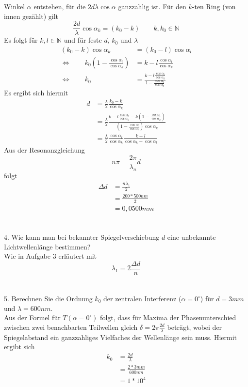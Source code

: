 \documentclass{article}
\begin{document}
Winkel $\alpha$ entstehen, für die $2d\lambda\cos\alpha$ ganzzahlig ist. Für den $k$-ten Ring (von innen gezählt) gilt
\[
\frac{2d}{\lambda}\cos {\alpha}_k=(k_0-k)\qquad k,k_0\in \mathbb{N}
\]
Es folgt für $k,l\in \mathbb{N}$ und für feste $d$, $k_0$ und $\lambda$
\begin{align*}
(k_0-k)\cos {\alpha}_k &= (k_0-l)\cos {\alpha}_l \\
\Leftrightarrow\qquad k_0(1-\frac{{ \cos\alpha}_l}{{\cos\alpha}_k}) &= k-l\frac{{\cos\alpha}_l}{{\cos\alpha}_k} \\
\Leftrightarrow\qquad k_0 &=\frac{k-l\frac{{\cos\alpha}_l}{{\cos\alpha}_k}}{1-\frac{{ \cos\alpha}_l}{{\cos\alpha}_k}}
\end{align*}
Es ergibt sich hiermit
\begin{align*}
d &=\frac{\lambda}{2}\frac{k_0-k}{\cos {\alpha}_k}\\
&=\frac{\lambda}{2}\frac{k-l\frac{{\cos\alpha}_l}{{\cos\alpha}_k}-k(1-\frac{{\cos\alpha}_l}{{\cos\alpha}_k})}{(1-\frac{{\cos\alpha}_l}{{\cos\alpha}_k})\cos{\alpha}_k}\\
&=\frac{\lambda}{2}\frac{{\cos\alpha}_l}{{\cos\alpha}_k}\frac{k-l}{\cos{\alpha}_k-\cos{\alpha}_l}
\end{align*}
Aus der Resonanzgleichung \[ n\pi = \frac{2\pi}{{\lambda}_n}d \] folgt
\begin{align*}
\Delta d &= \frac{n {\lambda}_1}{2}
\\ &=\frac{200*500nm}{2}
\\ &=0,0500mm
\end{align*}
\\
\\4. Wie kann man bei bekannter Spiegelverschiebung $d$ eine unbekannte Lichtwellenlänge bestimmen?\\
Wie in Aufgabe 3 erläutert mit
\[
{\lambda}_1=2\frac{\Delta d}{n}
\] \\
\\5. Berechnen Sie die Ordnung $k_0$ der zentralen Interferenz ($\alpha=0^\circ$) für $d=3mm$ und $\lambda =600nm$.
\\Aus der Formel für $T(\alpha=0^\circ)$ folgt, dass für Maxima der Phasenunterschied zwischen zwei benachbarten Teilwellen gleich $\delta=2\pi \frac{2d}{\lambda}$ beträgt, wobei der Spiegelabstand ein ganzzahliges Vielfaches der Wellenlänge sein muss. Hiermit ergibt sich
\begin{align*}
k_0 &= \frac{2d}{\lambda}
\\ &= \frac{2*3mm}{600nm}
\\ &= 1*10^4
\end{align*}\\
\end{document}
